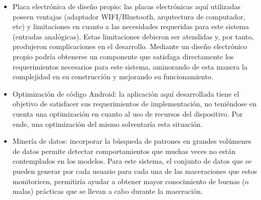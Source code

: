 \begin{itemize}
    \item Placa electrónica de diseño propio: las placas electrónicas aquí utilizadas poseen ventajas (adaptador WIFI/Bluetooth, arqutectura de computador, etc) y limitaciones  en cuanto a las necesidades requeridas para este sistema (entradas analógicas). Estas limitaciones debieron ser atendidas y, por tanto, produjeron complicaciones en el desarrollo. Mediante un diseño electrónico propio podría obtenerse un componente que satisfaga directamente los requerimientos necesarios para este sistema, aminorando de esta manera la complejidad en su construcción y mejorando su funcionamiento.
    
    \item Optimización de código Android: la aplicación aquí desarrollada tiene el objetivo de satisfacer sus requerimientos de implementación, no teniéndose en cuenta una optimización en cuanto al uso de recursos del dispositivo. Por ende, una optimización del mismo solventaría esta situación.
    
    \item Minería de datos: incorporar la búsqueda de patrones en grandes volúmenes de datos permite detectar comportamientos que muchas veces no están contemplados en los modelos. Para este sistema, el conjunto de datos que se pueden generar por cada usuario para cada una de las maceraciones que estos monitoricen, permitiría ayudar a obtener mayor conocimiento de buenas (o malas) prácticas que se llevan a cabo durante la maceración. 
    
    
\end{itemize}

\clearpage